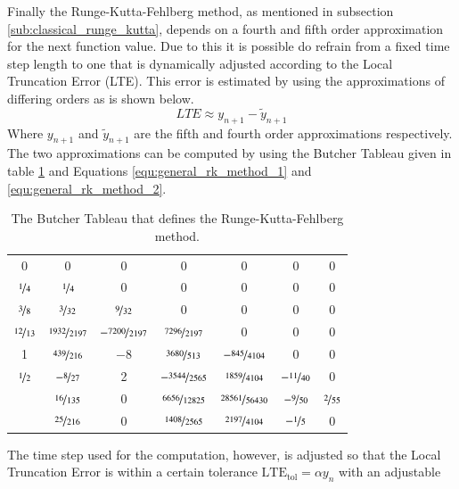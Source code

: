 \documentclass{aa}
\begin{document}
Finally the Runge-Kutta-Fehlberg method, as mentioned in subsection
\ref{sub:classical_runge_kutta}, depends on a fourth and fifth order approximation for the next
function value. Due to this it is possible do refrain from a fixed time step length to one that
is dynamically adjusted according to the Local Truncation Error (LTE). This error is estimated
by using the approximations of differing orders as is shown below.
\begin{equation}
    \label{eqn:lte}
    LTE \approx y_{n+1} - \tilde{y}_{n+1}
\end{equation}
Where \(y_{n+1}\) and \(\tilde{y}_{n+1}\) are the fifth and fourth order approximations
respectively. The two approximations can be computed by using the Butcher Tableau given in
table \ref{tab:rkf_butcher_tableau} and Equations \ref{equ:general_rk_method_1} and
\ref{equ:general_rk_method_2}.
\begin{table}[htpb]
    \centering
    \captionsetup{width = 0.9 \linewidth}
    \caption{The Butcher Tableau that defines the Runge-Kutta-Fehlberg method.}
    \label{tab:rkf_butcher_tableau}
    \begin{tabular}{c|cccccc}
        0 & 0 & 0 & 0 & 0 & 0 & 0 \\
        \(\nicefrac{1}{4}\) & \(\nicefrac{1}{4}\) & 0 & 0 & 0 & 0 & 0 \\
        \(\nicefrac{3}{8}\) & \(\nicefrac{3}{32}\) & \(\nicefrac{9}{32}\) & 0 & 0 & 0 & 0 \\
        \(\nicefrac{12}{13}\) & \(\nicefrac{1932}{2197}\) & \(-\nicefrac{7200}{2197}\) &
        \(\nicefrac{7296}{2197}\) & 0 & 0 & 0 \\
        1 & \(\nicefrac{439}{216}\) & \(-8\) & \(\nicefrac{3680}{513}\) &
        \(-\nicefrac{845}{4104}\) & 0 & 0 \\
        \(\nicefrac{1}{2}\) & \(-\nicefrac{8}{27}\) & 2 & \(-\nicefrac{3544}{2565}\) &
        \(\nicefrac{1859}{4104}\) & \(-\nicefrac{11}{40}\) & 0 \\ \hline
        & \(\nicefrac{16}{135}\) & 0 & \(\nicefrac{6656}{12825}\) & \(\nicefrac{28561}{56430}\)
        & \(-\nicefrac{9}{50}\) & \(\nicefrac{2}{55}\) \\
        & \(\nicefrac{25}{216}\) & 0 & \(\nicefrac{1408}{2565}\) & \(\nicefrac{2197}{4104}\) &
        \(-\nicefrac{1}{5}\) & 0
    \end{tabular}
\end{table}
The time step used for the computation, however, is adjusted so that the Local Truncation Error
is within a certain tolerance \(\mathrm{LTE}_\mathrm{tol} = \alpha y_n\) with an adjustable
\end{document}
